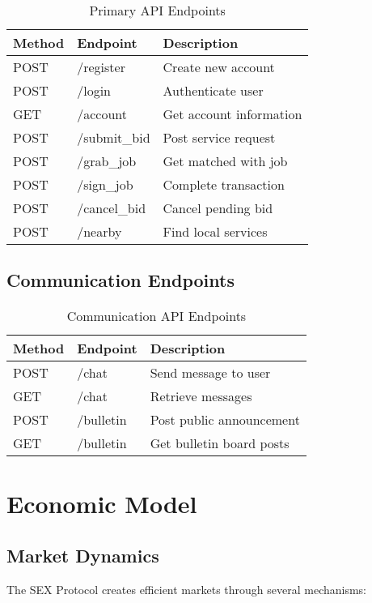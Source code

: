 \documentclass[11pt,a4paper]{article}
\begin{document}
\begin{table}[H]
\centering
\begin{tabularx}{\textwidth}{|l|l|X|}
\hline
\textbf{Method} & \textbf{Endpoint} & \textbf{Description} \\
\hline
POST & /register & Create new account \\
POST & /login & Authenticate user \\
GET & /account & Get account information \\
POST & /submit\_bid & Post service request \\
POST & /grab\_job & Get matched with job \\
POST & /sign\_job & Complete transaction \\
POST & /cancel\_bid & Cancel pending bid \\
POST & /nearby & Find local services \\
\hline
\end{tabularx}
\caption{Primary API Endpoints}
\end{table}

\subsection{Communication Endpoints}

\begin{table}[H]
\centering
\begin{tabularx}{\textwidth}{|l|l|X|}
\hline
\textbf{Method} & \textbf{Endpoint} & \textbf{Description} \\
\hline
POST & /chat & Send message to user \\
GET & /chat & Retrieve messages \\
POST & /bulletin & Post public announcement \\
GET & /bulletin & Get bulletin board posts \\
\hline
\end{tabularx}
\caption{Communication API Endpoints}
\end{table}

\section{Economic Model}

\subsection{Market Dynamics}

The SEX Protocol creates efficient markets through several mechanisms:
\end{document}
